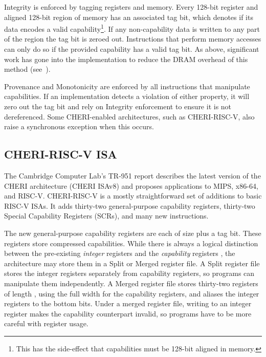 Integrity is enforced by tagging registers and memory.
Every 128-bit register and aligned 128-bit region of memory has an associated tag bit, which denotes if its data encodes a valid capability\footnote{This has the side-effect that capabilities must be 128-bit aligned in memory.}.
If any non-capability data is written to any part of the region the tag bit is zeroed out.
Instructions that perform memory accesses can only do so if the provided capability has a valid tag bit.
As above, significant work has gone into the implementation to reduce the DRAM overhead of this method (see~\cite{joannouEfficientTaggedMemory2017}).

\pagebreak
Provenance and Monotonicity are enforced by all instructions that manipulate capabilities.
If an implementation detects a violation of either property, it will zero out the tag bit and rely on Integrity enforcement to ensure it is not dereferenced.
Some CHERI-enabled architectures, such as CHERI-RISC-V, also raise a synchronous exception when this occurs.

\subsection{CHERI-RISC-V ISA}
The Cambridge Computer Lab's TR-951 report\cite{TR-951} describes the latest version of the CHERI architecture (CHERI ISAv8) and proposes applications to MIPS, x86-64, and RISC-V.
CHERI-RISC-V is a mostly straightforward set of additions to basic RISC-V ISAs.
It adds thirty-two general-purpose capability registers, thirty-two Special Capability Registers (SCRs), and many new instructions.

The new general-purpose capability registers are each of size  plus a tag bit.
These registers store compressed capabilities.
While there is always a logical distinction between the pre-existing \emph{integer} registers  and the \emph{capability} registers , the architecture may store them in a Split or Merged register file.\label{chap:bg:subsec:cherimergedreg}
A Split register file stores the integer registers separately from capability registers, so programs can manipulate them independently.
A Merged register file stores thirty-two registers of length , using the full width for the capability registers, and aliases the integer registers to the bottom  bits.
Under a merged register file, writing to an integer register makes the capability counterpart invalid, so programs have to be more careful with register usage.

